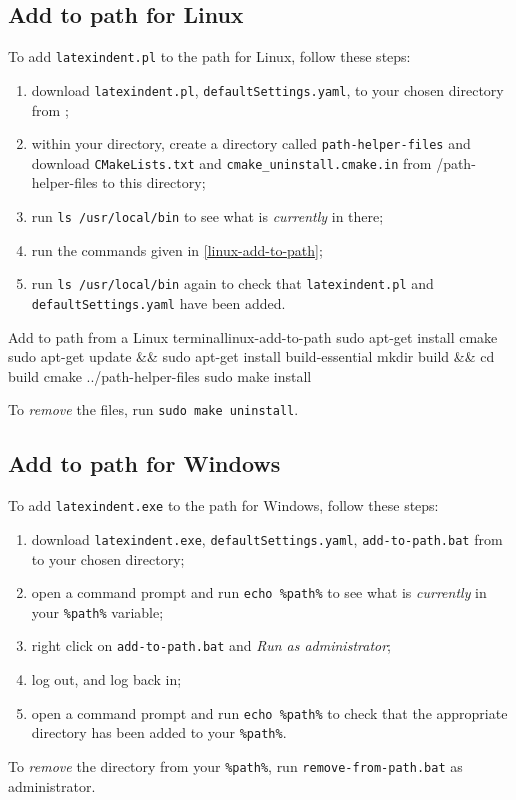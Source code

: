 \documentclass[11pt]{article}
\begin{document}
\subsection{Add to path for Linux}
To add \lstinline!latexindent.pl! to the path for Linux, follow these steps:
\begin{enumerate}
	\item download  \lstinline!latexindent.pl!, \lstinline!defaultSettings.yaml!,  to your
      chosen directory from \cite{latexindent-home} ; 
    \item within your directory, create a directory called \lstinline!path-helper-files! and 
      download \lstinline!CMakeLists.txt! and \lstinline!cmake_uninstall.cmake.in!
	      from \cite{latexindent-home}/path-helper-files to this directory;
	\item run \lstinline!ls /usr/local/bin! to see what is \emph{currently} in there;
	\item run the commands given in \cref{linux-add-to-path};
	\item run \lstinline!ls /usr/local/bin! again to check that \lstinline!latexindent.pl! and \lstinline!defaultSettings.yaml!
	      have been added.
\end{enumerate}
\begin{cmhlistings}[style=yaml,numbers=none]{Add to path from a Linux terminal}{linux-add-to-path}
sudo apt-get install cmake
sudo apt-get update && sudo apt-get install build-essential
mkdir build && cd build
cmake ../path-helper-files
sudo make install
\end{cmhlistings}
To \emph{remove} the files, run \lstinline!sudo make uninstall!.
\subsection{Add to path for Windows}
To add \lstinline!latexindent.exe! to the path for Windows, follow these steps:
\begin{enumerate}
	\item download  \lstinline!latexindent.exe!, \lstinline!defaultSettings.yaml!,  \lstinline!add-to-path.bat!
	      from \cite{latexindent-home} to your chosen directory;
	\item open a command prompt and run \lstinline!echo %path%! to see what is \emph{currently} in your \lstinline!%path%! variable;
	\item right click on \lstinline!add-to-path.bat! and \emph{Run as administrator};
	\item log out, and log back in;
	\item open a command prompt and run \lstinline!echo %path%! to check that the appropriate directory has been added to your
	      \lstinline!%path%!.
\end{enumerate}
To \emph{remove} the directory from your \lstinline!%path%!, run \lstinline!remove-from-path.bat! as administrator.
\end{document}
